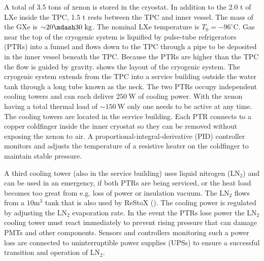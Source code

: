 A total of 3.5 tons of xenon is stored in the cryostat.  In addition to the 2.0 t of LXe inside the TPC, 1.5 t rests between the
TPC and inner vessel.  The mass of the GXe is ${\sim} 20 \mdash 30\ \mathrm{kg}$.  The nominal LXe temperature is
$T_{0} = -96^{\circ} \mathrm{C}$.  Gas near the top of
the cryogenic system is liquified by pulse-tube refrigerators (PTRs) into a funnel and flows down to the TPC through a pipe to be
deposited in the inner vessel beneath the TPC.  Because
the PTRs are higher than the TPC the flow is guided by gravity.   shows the layout of the
cryogenic
system.  The cryogenic system extends from the TPC into a service building outside the water tank through a long tube known as the
neck.  The two PTRs occupy independent
cooling towers and can each deliver $250\ \mathrm{W}$ of cooling power.  With the xenon
having a total thermal load of ${\sim} 150\ \mathrm{W}$ only one needs to be active at any time.  The cooling towers
are located in the service building.  Each PTR connects to a copper coldfinger
inside the inner cryostat so they can be removed without exposing the xenon to air.  A proportional-integral-derivative (PID) controller
monitors and adjusts the temperature of a resistive heater on the coldfinger to maintain stable pressure.

A third cooling tower (also in the service building) uses liquid nitrogen ($\mathrm{LN_2}$) and can be used in an emergency, if both PTRs
are being serviced, or the
heat load becomes too great from e.g. loss of power or insulation vacuum.  The $\mathrm{LN_2}$ flows from a $10 \mathrm{m^3}$ tank that
is also used by ReStoX ().  The cooling power is regulated by adjusting the $\mathrm{LN_2}$ evaporation
rate.  In the event the PTRs
lose power the $\mathrm{LN_2}$ cooling tower must react immediately to prevent rising pressure that can damage PMTs and other
components.  Sensors and controllers monitoring such a power loss are connected to uninterruptible power supplies (UPSs) to ensure a
successful transition and operation of $\mathrm{LN_2}$.

